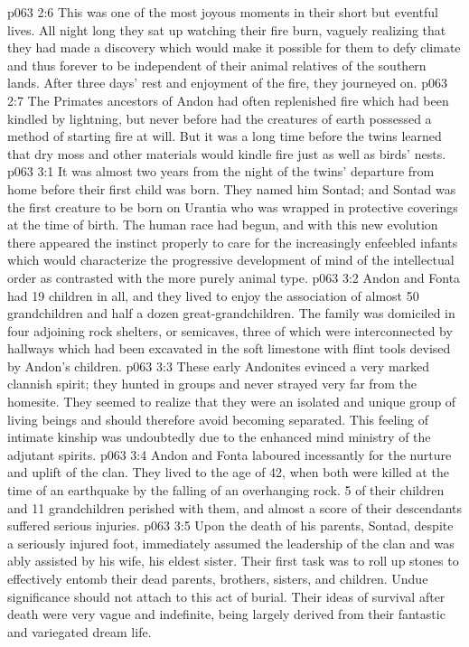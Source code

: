 \vs p063 2:6 This was one of the most joyous moments in their short but eventful lives. All night long they sat up watching their fire burn, vaguely realizing that they had made a discovery which would make it possible for them to defy climate and thus forever to be independent of their animal relatives of the southern lands. After three days’ rest and enjoyment of the fire, they journeyed on.
\vs p063 2:7 The Primates ancestors of Andon had often replenished fire which had been kindled by lightning, but never before had the creatures of earth possessed a method of starting fire at will. But it was a long time before the twins learned that dry moss and other materials would kindle fire just as well as birds’ nests.
\vs p063 3:1 It was almost two years from the night of the twins’ departure from home before their first child was born. They named him Sontad; and Sontad was the first creature to be born on Urantia who was wrapped in protective coverings at the time of birth. The human race had begun, and with this new evolution there appeared the instinct properly to care for the increasingly enfeebled infants which would characterize the progressive development of mind of the intellectual order as contrasted with the more purely animal type.
\vs p063 3:2 Andon and Fonta had 19 children in all, and they lived to enjoy the association of almost 50 grandchildren and half a dozen great\hyp{}grandchildren. The family was domiciled in four adjoining rock shelters, or semicaves, three of which were interconnected by hallways which had been excavated in the soft limestone with flint tools devised by Andon’s children.
\vs p063 3:3 These early Andonites evinced a very marked clannish spirit; they hunted in groups and never strayed very far from the homesite. They seemed to realize that they were an isolated and unique group of living beings and should therefore avoid becoming separated. This feeling of intimate kinship was undoubtedly due to the enhanced mind ministry of the adjutant spirits.
\vs p063 3:4 \pc Andon and Fonta laboured incessantly for the nurture and uplift of the clan. They lived to the age of 42, when both were killed at the time of an earthquake by the falling of an overhanging rock. 5 of their children and 11 grandchildren perished with them, and almost a score of their descendants suffered serious injuries.
\vs p063 3:5 Upon the death of his parents, Sontad, despite a seriously injured foot, immediately assumed the leadership of the clan and was ably assisted by his wife, his eldest sister. Their first task was to roll up stones to effectively entomb their dead parents, brothers, sisters, and children. Undue significance should not attach to this act of burial. Their ideas of survival after death were very vague and indefinite, being largely derived from their fantastic and variegated dream life.
